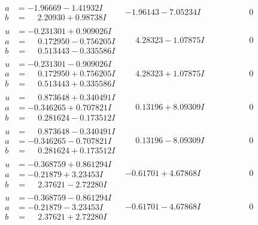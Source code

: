 \documentclass[1p]{elsarticle_modified}
\theoremstyle{definition}
\begin{document}
$$\begin{array}{c|c|c}
\begin{aligned}
a &= -1.96669 - 1.41932 I \\
b &= \phantom{-}2.20930 + 0.98738 I\end{aligned}
 & -1.96143 - 7.05234 I & \phantom{-0.000000 } 0 \\ \hline\begin{aligned}
u &= -0.231301 + 0.909026 I \\
a &= \phantom{-}0.172950 - 0.756205 I \\
b &= \phantom{-}0.513443 - 0.335586 I\end{aligned}
 & \phantom{-}4.28323 - 1.07875 I & \phantom{-0.000000 } 0 \\ \hline\begin{aligned}
u &= -0.231301 - 0.909026 I \\
a &= \phantom{-}0.172950 + 0.756205 I \\
b &= \phantom{-}0.513443 + 0.335586 I\end{aligned}
 & \phantom{-}4.28323 + 1.07875 I & \phantom{-0.000000 } 0 \\ \hline\begin{aligned}
u &= \phantom{-}0.873648 + 0.340491 I \\
a &= -0.346265 + 0.707821 I \\
b &= \phantom{-}0.281624 - 0.173512 I\end{aligned}
 & \phantom{-}0.13196 + 8.09309 I & \phantom{-0.000000 } 0 \\ \hline\begin{aligned}
u &= \phantom{-}0.873648 - 0.340491 I \\
a &= -0.346265 - 0.707821 I \\
b &= \phantom{-}0.281624 + 0.173512 I\end{aligned}
 & \phantom{-}0.13196 - 8.09309 I & \phantom{-0.000000 } 0 \\ \hline\begin{aligned}
u &= -0.368759 + 0.861294 I \\
a &= -0.21879 + 3.23453 I \\
b &= \phantom{-}2.37621 - 2.72280 I\end{aligned}
 & -0.61701 + 4.67868 I & \phantom{-0.000000 } 0 \\ \hline\begin{aligned}
u &= -0.368759 - 0.861294 I \\
a &= -0.21879 - 3.23453 I \\
b &= \phantom{-}2.37621 + 2.72280 I\end{aligned}
 & -0.61701 - 4.67868 I & \phantom{-0.000000 } 0 \\ \hline\begin{aligned}

\end{aligned}
\end{array}$$
\end{document}
